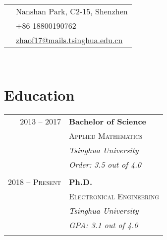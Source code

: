 \documentclass[10pt]{article} %
\begin{document}
{\begin{minipage}[t]{0.44\textwidth}
\colorbox{shade}{\textcolor{text1}{
\begin{tabular}{c|p{7cm}}
\raisebox{-4pt}{\textifsymbol{18}} & Nanshan Park, C2-15, Shenzhen \\ %
\raisebox{-3pt}{\Mobilefone} & +86 18800190762 \\ %
\raisebox{-1pt}{\Letter} & \href{mailto:zhaof17@mails.tsinghua.edu.cn}{zhaof17@mails.tsinghua.edu.cn} \\ %
\end{tabular}
}
}\\[10pt]


\section{Education}

\begin{tabular}{rl} %


2013 -- 2017 & \textbf{Bachelor of Science} \\
& \textsc{Applied Mathematics} \\
& \textit{Tsinghua University}\\
& \textit{Order: 3.5 out of 4.0}\\
&\\

2018 -- \textsc{Present} & \textbf{Ph.D.} \\
& \textsc{Electronical Engineering} \\
& \textit{Tsinghua University}\\
& \textit{GPA: 3.1 out of 4.0}\\
&\\


\end{tabular}\\[10pt]



\end{minipage}}
\end{document}
